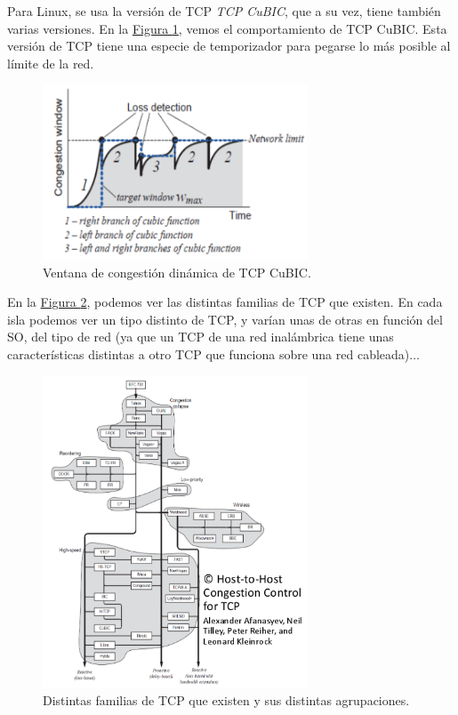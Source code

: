\documentclass[10pt,a4paper,spanish]{report}
\begin{document}
Para Linux, se usa la versión de TCP \textit{\textcolor{tema3}{TCP CuBIC}}, que a su vez, tiene también varias versiones. En la \hyperref[cubic]{Figura \ref*{cubic}}, vemos el comportamiento de TCP CuBIC. Esta versión de TCP tiene una especie de temporizador para pegarse lo más posible al límite de la red. 

\begin{figure}[!h]
  \centering
  \includegraphics[width=0.7\textwidth]{cubic}
  \caption{Ventana de congestión dinámica de TCP CuBIC.}
  \label{cubic}
\end{figure}

En la \hyperref[tcpfamily]{Figura \ref*{tcpfamily}}, podemos ver las distintas familias de TCP que existen. En cada isla podemos ver un tipo distinto de TCP, y varían unas de otras en función del SO, del tipo de red (ya que un TCP de una red inalámbrica tiene unas características distintas a otro TCP que funciona sobre una red cableada)$\ldots$


\begin{figure}[!h]
  \centering
  \includegraphics[width=0.7\textwidth]{tcpfamily}
  \caption{Distintas familias de TCP que existen y sus distintas agrupaciones.}
  \label{tcpfamily}
\end{figure}
\end{document}
